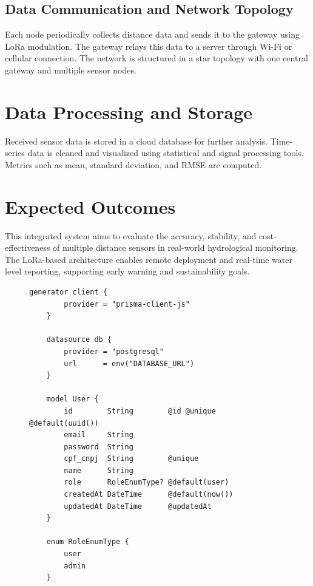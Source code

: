 \subsection{Data Communication and Network Topology}
Each node periodically collects distance data and sends it to the gateway using LoRa modulation. The gateway relays this data to a server through Wi-Fi or cellular connection. The network is structured in a star topology with one central gateway and multiple sensor nodes.

\section{Data Processing and Storage}
Received sensor data is stored in a cloud database for further analysis. Time-series data is cleaned and visualized using statistical and signal processing tools. Metrics such as mean, standard deviation, and RMSE are computed.

\section{Expected Outcomes}
This integrated system aims to evaluate the accuracy, stability, and cost-effectiveness of multiple distance sensors in real-world hydrological monitoring. The LoRa-based architecture enables remote deployment and real-time water level reporting, supporting early warning and sustainability goals. 

\begin{figure}[h]
	\begin{lstlisting}[caption={Exemplo de um schema no Prisma.}, label={code:prisma}]
	generator client {
		provider = "prisma-client-js"
	}
	
	datasource db {
		provider = "postgresql"
		url      = env("DATABASE_URL")
	}
	
	model User {
		id        String        @id @unique @default(uuid())
		email     String        
		password  String
		cpf_cnpj  String        @unique
		name      String
		role      RoleEnumType? @default(user)
		createdAt DateTime      @default(now())
		updatedAt DateTime      @updatedAt
	}
	
	enum RoleEnumType {
		user
		admin
	}
		
	\end{lstlisting}
	
	\end{figure}


